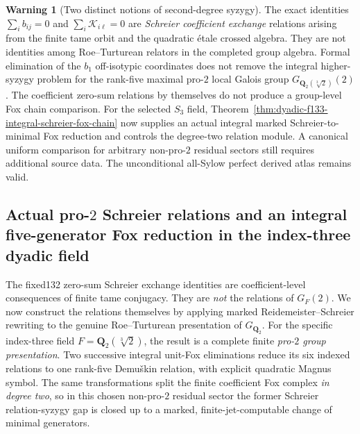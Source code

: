 \documentclass[11pt]{article}
\theoremstyle{definition}
\newtheorem{warning}[theorem]{Warning}
\begin{document}
\begin{warning}[Two distinct notions of second-degree syzygy]
\label{warn:dyadic-f132-fox-versus-exchange-syzygy}
The exact identities
$\sum_i b_{ij}=0$
and
$\sum_i\mathscr K_{i\ell}=0$
are \emph{Schreier
coefficient exchange}
relations arising
from the finite
tame orbit and
the quadratic
\'etale crossed
algebra.
They are not
identities among
Roe--Turturean
relators in the
completed group
algebra.
Formal elimination
of the $b_1$
off-isotypic
coordinates
does not remove
the integral
higher-syzygy
problem for the
rank-five maximal
pro-$2$ local
Galois group
$G_{\mathbf Q_2(\sqrt[3]2)}(2)$.
The coefficient
zero-sum relations
by themselves do not
produce a group-level
Fox chain comparison.
For the selected
$S_3$ field,
Theorem~\ref{thm:dyadic-f133-integral-schreier-fox-chain}
now supplies an
actual integral
marked Schreier-to-minimal
Fox reduction and
controls the degree-two
relation module.
A canonical uniform
comparison for arbitrary
non-pro-$2$ residual
sectors still requires
additional source data.
The unconditional
all-Sylow perfect
derived atlas
remains valid.
\end{warning}


\subsection{Actual pro-$2$ Schreier relations and an integral
five-generator Fox reduction in the index-three dyadic field}
\label{subsec:dyadic-f133-actual-syzygy}

The fixed132 zero-sum Schreier exchange identities
are coefficient-level consequences of finite
tame conjugacy.  They are \emph{not}
the relations of $G_F(2)$.
We now construct the relations themselves
by applying marked Reidemeister--Schreier
rewriting to the genuine Roe--Turturean
presentation of $G_{\mathbf Q_2}$.
For the specific index-three field
$F=\mathbf Q_2(\sqrt[3]2)$,
the result is a complete finite
\emph{pro-$2$ group presentation}.
Two successive integral unit-Fox
eliminations reduce its six indexed
relations to one rank-five Demu\v{s}kin
relation, with explicit quadratic
Magnus symbol.  The same transformations
split the finite coefficient
Fox complex \emph{in degree two},
so in this chosen non-pro-$2$
residual sector the former
Schreier relation-syzygy gap
is closed up to a
marked, finite-jet-computable
change of minimal generators.
\end{document}
